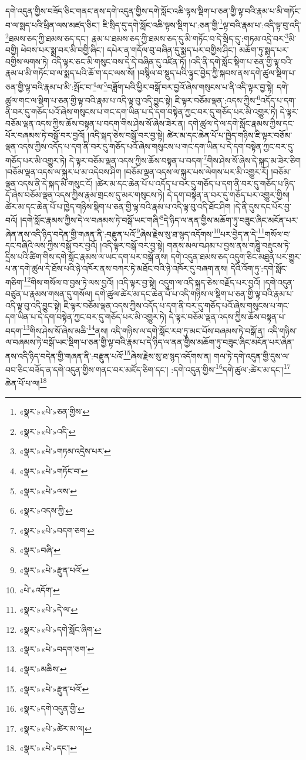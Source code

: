 དགེ་འདུན་གྱིས་བཟོད་ཅིང་གནང་ནས་དགེ་འདུན་གྱིས་དགེ་སློང་འཆི་ལྟས་སྡིག་པ་ཅན་གྱི་ལྟ་བའི་རྣམ་པ་མི་གཏོང་བ་ལ་སྨད་པའི་ཕྲིན་ལས་མཛད་ཅིང་། ཇི་སྲིད་དུ་དགེ་སློང་འཆི་ལྟས་སྡིག་པ་:ཅན་གྱི་\footnote{«སྣར་»«པེ་»ཅན་གྱིས་}ལྟ་བའི་རྣམ་པ་:འདི་ལྟ་བུ་འདི་\footnote{«སྣར་»«པེ་»འདི་}ཐམས་ཅད་ཀྱི་ཐམས་ཅད་དང་། རྣམ་པ་ཐམས་ཅད་ཀྱི་ཐམས་ཅད་དུ་མི་གཏོང་བ་དེ་སྲིད་དུ་:གཏམ་འདྲེ་བར་\footnote{«སྣར་»«པེ་»གཏམ་འདྲེས་པར་}མི་བགྱི། ཕེབས་པར་སྨྲ་བར་མི་བགྱི་ཞིང་། དཔེར་ན་གདོལ་བུ་བཞིན་དུ་སྨད་པར་བགྱིས་ཤིང་། མཆོག་ཏུ་སྨད་པར་བགྱིས་ལགས་ཏེ། འདི་ལྟར་ཅང་མི་གསུང་བས་དེ་དེ་བཞིན་དུ་འཛིན་ཏོ། །འདི་ནི་དགེ་སློང་སྡིག་པ་ཅན་གྱི་ལྟ་བའི་རྣམ་པ་མི་གཏོང་བ་ལ་སྨད་པའི་ཆོ་ག་དང་ལས་སོ། །བསྙིལ་བ་སྡུད་པའི་ལྟུང་བྱེད་ཀྱི་སྐབས་ནས་དགེ་ཚུལ་སྡིག་པ་ཅན་གྱི་ལྟ་བའི་རྣམ་པ་མི་:སྤོང་བ་\footnote{«སྣར་»«པེ་»གཏོང་བ་}ལ་\footnote{«སྣར་»«པེ་»ལས་}བཟློག་པའི་ཕྱིར་བསྒོ་བར་བྱའོ་ཞེས་གསུངས་པ་ནི་འདི་ལྟར་བྱ་སྟེ། དགེ་ཚུལ་གང་ལ་སྡིག་པ་ཅན་གྱི་ལྟ་བའི་རྣམ་པ་འདི་ལྟ་བུ་འདི་བྱུང་སྟེ། ཇི་ལྟར་བཅོམ་ལྡན་:འདས་ཀྱིས་\footnote{«སྣར་»འདས་ཀྱི་}འདོད་པ་དག་ནི་བར་དུ་གཅོད་པའོ་ཞེས་གསུངས་པ་གང་དག་ཡིན་པ་དེ་དག་བསྟེན་ཀྱང་བར་དུ་གཅོད་པར་མི་འགྱུར་ཏེ། དེ་ལྟར་བཅོམ་ལྡན་འདས་ཀྱིས་ཆོས་བསྟན་པ་བདག་གིས་ཤེས་སོ་ཞེས་ཟེར་ན། དགེ་ཚུལ་དེ་ལ་དགེ་སློང་རྣམས་ཀྱིས་དང་པོར་བཞམས་ཏེ་བསྒོ་བར་བྱའོ། །འདི་སྐད་ཅེས་བསྒོ་བར་བྱ་སྟེ། ཚེར་མ་དང་ཆེན་པོ་པ་ཁྱེད་གཉིས་ཇི་ལྟར་བཅོམ་ལྡན་འདས་ཀྱིས་འདོད་པ་དག་ནི་བར་དུ་གཅོད་པའོ་ཞེས་གསུངས་པ་གང་དག་ཡིན་པ་དེ་དག་བསྟེན་ཀྱང་བར་དུ་གཅོད་པར་མི་འགྱུར་ཏེ། དེ་ལྟར་བཅོམ་ལྡན་འདས་ཀྱིས་ཆོས་བསྟན་པ་བདག་\footnote{«སྣར་»«པེ་»བདག་ཅག་}གིས་ཤེས་སོ་ཞེས་དེ་སྐད་མ་ཟེར་ཅིག །བཅོམ་ལྡན་འདས་ལ་སྐུར་པ་མ་འདེབས་ཤིག །བཅོམ་ལྡན་འདས་ལ་སྐུར་པས་ལེགས་པར་མི་འགྱུར་རོ། །བཅོམ་ལྡན་འདས་ནི་དེ་སྐད་མི་གསུང་ངོ། །ཚེར་མ་དང་ཆེན་པོ་པ་འདོད་པ་བར་དུ་གཅོད་པ་དག་ནི་བར་དུ་གཅོད་པ་ཉིད་དོ་ཞེས་བཅོམ་ལྡན་འདས་ཀྱིས་རྣམ་གྲངས་དུ་མར་གསུངས་ཏེ། དེ་དག་བསྟེན་ན་བར་དུ་གཅོད་པར་འགྱུར་གྱིས། ཚེར་མ་དང་ཆེན་པོ་པ་ཁྱེད་གཉིས་སྡིག་པ་ཅན་གྱི་ལྟ་བའི་རྣམ་པ་འདི་ལྟ་བུ་འདི་ཐོང་ཤིག །དེ་ནི་དུས་དང་པོར་བྱ་བའོ། །དགེ་སློང་རྣམས་ཀྱིས་དེ་ལ་བཞམས་ཏེ་བསྒོ་ཡང་གཞི་\footnote{«སྣར་»བཞི་}དེ་ཉིད་ལ་ནན་གྱིས་མཆོག་ཏུ་བཟུང་ཞིང་མངོན་པར་ཞེན་ནས་འདི་ཉིད་བདེན་གྱི་གཞན་ནི་:བརྫུན་པའོ་\footnote{«སྣར་»«པེ་»རྫུན་པའོ་}ཞེས་རྗེས་སུ་ཐ་སྙད་འདོགས་\footnote{«པེ་»འདོག་}པར་བྱེད་ན་དེ་\footnote{«སྣར་»«པེ་»དེ་ལ་}གསོལ་བ་དང་བཞིའི་ལས་ཀྱིས་བསྒོ་བར་བྱའོ། །འདི་ལྟར་བསྒོ་བར་བྱ་སྟེ། གནས་མལ་བཤམ་པ་བྱས་ནས་གཎྜཱི་བརྡུངས་ཏེ་དྲིས་པའི་ཚིག་གིས་དགེ་སློང་རྣམས་ལ་ཡང་དག་པར་བསྒོ་ནས། དགེ་འདུན་ཐམས་ཅད་འདུག་ཅིང་མཐུན་པར་གྱུར་པ་ན་དགེ་ཚུལ་དེ་ཐོས་པའི་ཉེ་འཁོར་ནས་བཀར་ཏེ་མཐོང་བའི་ཉེ་འཁོར་དུ་བཞག་ནས། དེའི་འོག་ཏུ་:དགེ་སློང་གཅིག་\footnote{«སྣར་»«པེ་»དགེ་སློང་ཞིག་}གིས་གསོལ་བ་བྱས་ཏེ་ལས་བྱའོ། །འདི་ལྟར་བྱ་སྟེ། འདུག་ལ་འདི་སྐད་ཅེས་བརྗོད་པར་བྱའོ། །དགེ་འདུན་བཙུན་པ་རྣམས་གསན་དུ་གསོལ། དགེ་ཚུལ་ཚེར་མ་དང་ཆེན་པོ་པ་འདི་གཉིས་ལ་སྡིག་པ་ཅན་གྱི་ལྟ་བའི་རྣམ་པ་འདི་ལྟ་བུ་འདི་བྱུང་སྟེ། ཇི་ལྟར་བཅོམ་ལྡན་འདས་ཀྱིས་འདོད་པ་དག་ནི་བར་དུ་གཅོད་པའོ་ཞེས་གསུངས་པ་གང་དག་ཡིན་པ་དེ་དག་བསྟེན་ཀྱང་བར་དུ་གཅོད་པར་མི་འགྱུར་ཏེ། དེ་ལྟར་བཅོམ་ལྡན་འདས་ཀྱིས་ཆོས་བསྟན་པ་བདག་\footnote{«སྣར་»«པེ་»བདག་ཅག་}གིས་ཤེས་སོ་ཞེས་མཆི་\footnote{«སྣར་»མཆིས་}ནས། འདི་གཉིས་ལ་དགེ་སློང་རབ་ཏུ་མང་པོས་བཞམས་ཏེ་བསྒོ་ན། འདི་གཉིས་ལ་བཞམས་ཏེ་བསྒོ་ཡང་སྡིག་པ་ཅན་གྱི་ལྟ་བའི་རྣམ་པ་དེ་ཉིད་ལ་ནན་གྱིས་མཆོག་ཏུ་བཟུང་ཞིང་མངོན་པར་ཞེན་ནས་འདི་ཉིད་བདེན་གྱི་གཞན་ནི་:བརྫུན་པའོ་\footnote{«སྣར་»«པེ་»རྫུན་པའོ་}ཞེས་རྗེས་སུ་ཐ་སྙད་འདོགས་ན། གལ་ཏེ་དགེ་འདུན་གྱི་དུས་ལ་བབ་ཅིང་བཟོད་ན་དགེ་འདུན་གྱིས་གནང་བར་མཛོད་ཅིག་དང་། :དགེ་འདུན་གྱིས་\footnote{«སྣར་»དགེ་འདུན་གྱི་}དགེ་ཚུལ་:ཚེར་མ་དང་།\footnote{«སྣར་»«པེ་»ཚེར་མ་ལ།} ཆེན་པོ་པ་ལ།\footnote{«སྣར་»«པེ་»དང་།} 